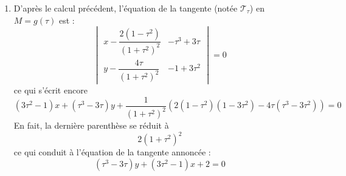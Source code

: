 \begin{enumerate}
\item D'après le calcul précédent, l'équation de la tangente (notée $\mathcal T_\tau$) en $M=g(\tau)$ est :
\begin{equation*}
 \begin{vmatrix}
  x - \dfrac{2(1-\tau^2)}{(1+\tau^2)^2} & -\tau^3 + 3\tau \\
 y - \dfrac{4\tau}{(1+\tau^2)^2}& -1+3\tau^2
 \end{vmatrix}
=0
\end{equation*}
ce qui s'écrit encore
\begin{equation*}
 (3\tau^2-1)x + (\tau^3-3\tau)y + \dfrac{1}{(1+\tau^2)^2} \left( 
 2(1-\tau^2)(1-3\tau^2) -4\tau(\tau^3-3\tau^2)
\right) =0
\end{equation*}
En fait, la dernière parenthèse se réduit à
\begin{displaymath}
 2(1+\tau^2)^2
\end{displaymath}
ce qui conduit à l'équation de la tangente annoncée :
\begin{equation*}
 (\tau^3-3\tau)y+(3\tau^2-1)x+2=0
\end{equation*}


\end{enumerate}
